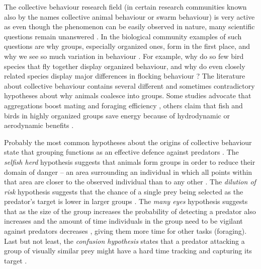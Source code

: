The collective behaviour research field (in certain research communities known also by the names collective animal behaviour or swarm behaviour) is very active as even though the phenomenon can be easily observed in nature, many scientific questions remain unanswered \cite{krause2002living,lebarbajec2009organized,sumpter2006principles}. In the biological community examples of such questions are why groups, especially organized ones, form in the first place, and why we see so much variation in behaviour \cite{lebarbajec2009organized}. For example, why do so few bird species that fly together display organized behaviour, and why do even closely related species \cite{jarvis2014wholegenome} display major differences in flocking behaviour \cite{lebarbajec2009organized}? The literature about collective behaviour contains several different and sometimes contradictory hypotheses about why animals coalesce into groups. Some studies advocate that aggregations boost mating and foraging efficiency \cite{krebs1994behavioural}, others claim that fish and birds in highly organized groups save energy because of hydrodynamic or aerodynamic benefits \cite{hemelrijk2014increased,marras2015fish,portugal2014upwash}.

Probably the most common hypotheses about the origins of collective behaviour state that grouping functions as an effective defence against predators \cite{cresswell2011predicting,hart2005predator,krause2002living,larsson2012why,lebarbajec2009organized,nishimura2002predator,pavlov2000patterns}. The \emph{selfish herd} hypothesis \cite{hamilton1971geometry} suggests that animals form groups in order to reduce their domain of danger -- an area surrounding an individual in which all points within that area are closer to the observed individual than to any other \cite{viscido2001response}. The \emph{dilution of risk} hypothesis suggests that the chance of a single prey being selected as the predator's target is lower in larger groups \cite{tosh2011conditions}. The \emph{many eyes} hypothesis suggests that as the size of the group increases the probability of detecting a predator also increases \cite{galton1871gregariousness} and the amount of time individuals in the group need to be vigilant against predators decreases \cite{elgar1989predator,haley2014exploring,ruxton2008application,sadedin1998influence}, giving them more time for other tasks (\eg foraging). Last but not least, the \emph{confusion hypothesis} states that a predator attacking a group of visually similar prey might have a hard time tracking and capturing its target \cite{demsar2015simulating,kunz2006prey,nishimura2002predator,olson2013predator,olson2016evolution,zheng2005behavior}.

